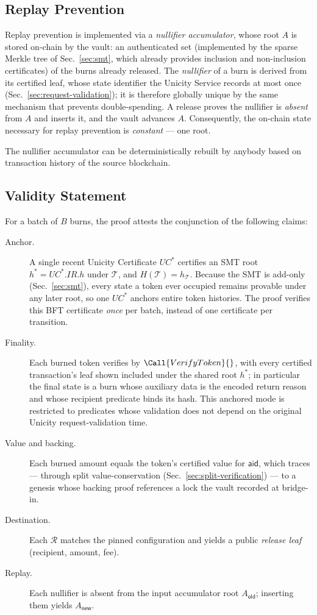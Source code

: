 \subsection{Replay Prevention}\label{sec:bridge-replay}

Replay prevention is implemented via a \emph{nullifier accumulator}, whose root $A$ is stored on-chain by the vault: an authenticated set (implemented by the sparse Merkle tree of Sec.~\ref{sec:smt}, which already provides inclusion and non-inclusion certificates) of the burns already released. The \emph{nullifier} of a burn is derived from its certified leaf, whose state identifier the Unicity Service records at most once (Sec.~\ref{sec:request-validation}); it is therefore globally unique by the same mechanism that prevents double-spending. A release proves the nullifier is \emph{absent} from $A$ and inserts it, and the vault advances $A$. Consequently, the on-chain state necessary for replay prevention is \emph{constant} --- one root.

The nullifier accumulator can be deterministically rebuilt by anybody based on transaction history of the source blockchain.

\subsection{Validity Statement}\label{sec:bridge-statement}

For a batch of $B$ burns, the proof attests the conjunction of the following claims:

\begin{description}
\item[Anchor.] A single recent Unicity Certificate $UC^*$ certifies an SMT root $h^* = UC^*.IR.h$ under $\mathcal{T}$, and $H(\mathcal{T}) = h_\mathcal{T}$. Because the SMT is add-only (Sec.~\ref{sec:smt}), every state a token ever occupied remains provable under any later root, so one $UC^*$ anchors entire token histories. The proof verifies this BFT certificate \emph{once} per batch, instead of one certificate per transition.
\item[Finality.] Each burned token verifies by $\Call{VerifyToken}{}$, with every certified transaction's leaf shown included under the shared root $h^*$; in particular the final state is a burn whose auxiliary data is the encoded return reason and whose recipient predicate binds its hash. This anchored mode is restricted to predicates whose validation does not depend on the original Unicity request-validation time.
\item[Value and backing.] Each burned amount equals the token's certified value for $\mathsf{aid}$, which traces --- through split value-conservation (Sec.~\ref{sec:split-verification}) --- to a genesis whose backing proof references a lock the vault recorded at bridge-in.
\item[Destination.] Each $\mathcal{R}$ matches the pinned configuration and yields a public \emph{release leaf} (recipient, amount, fee).
\item[Replay.] Each nullifier is absent from the input accumulator root $A_\mathsf{old}$; inserting them yields $A_\mathsf{new}$.
\end{description}

